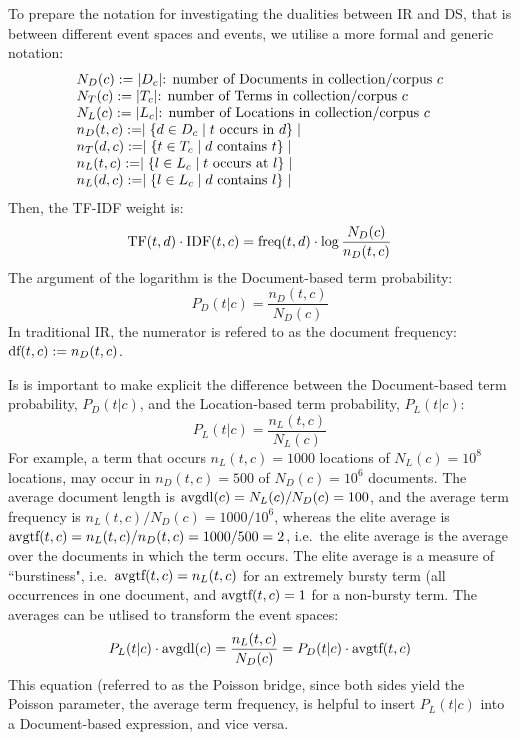 To prepare the notation for investigating the dualities between IR and DS,
that is between different event spaces and events,
we utilise a more formal and generic notation:
\[
\begin{array}{ll}
N_D(c) := |D_c| \textmd{: number of Documents in collection/corpus $c$}\\
N_T(c) := |T_c| \textmd{: number of Terms in collection/corpus $c$}\\
N_L(c) := |L_c| \textmd{: number of Locations in collection/corpus $c$}\\
n_D(t,c) := \mid \{d \in D_c \mid t \ \textmd{occurs in} \ d\}\mid\\
n_T(d,c) := \mid \{t \in T_c \mid d \ \textmd{contains} \ t\} \mid\\
n_L(t,c) := \mid \{l \in L_c \mid t \ \textmd{occurs at} \ l\} \mid\\
n_L(d,c) := \mid \{l \in L_c \mid d \ \textmd{contains} \ l\} \mid\\
\end{array}
\]
Then, the TF-IDF weight is:
\begin{equation}
\label{tf-idf}
\textmd{TF}(t,d) \cdot \textmd{IDF}(t,c) =
	\textmd{freq}(t, d) \cdot
	\log{{N_D(c)} \over n_D(t,c)}
\end{equation}
The argument of the logarithm is the Document-based term probability:
\[
P_{D}(t|c) =\frac{n_D(t,c)}{N_D(c)}
\]
In traditional IR, the numerator is refered to as the document frequency:
$\textmd{df}(t,c):=n_D(t,c)$.

Is is important to make explicit the difference between the Document-based
term probability, $P_D(t|c)$, and the Location-based term probability, $P_L(t|c)$:
\[
P_{L}(t|c) =\frac{n_L(t,c)}{N_L(c)}
\]
For example, a term that occurs $n_L(t,c)=1000$ locations of $N_L(c)=10^8$ locations,
may occur in $n_D(t,c)=500$ of $N_D(c)=10^6$ documents.
%
The average document length is $\textmd{avgdl}(c)=N_L(c)/N_D(c)=100$, and the
average term frequency is $n_L(t,c)/N_D(c)=1000/10^6$, whereas the
elite average is $\textmd{avgtf}(t,c)=n_L(t,c)/n_D(t,c)=1000/500=2$,
i.e.~the elite average is the average
over the documents in which the term occurs.
%
The elite average is a measure of ``burstiness", i.e.~$\textmd{avgtf}(t,c)=n_L(t,c)$ for
an extremely bursty term (all occurrences in one document, and $\textmd{avgtf}(t,c)=1$
for a non-bursty term.
%
The averages can be utlised to transform the event spaces:
\[
P_L(t|c) \cdot \textmd{avgdl}(c) = \frac{n_L(t,c)}{N_D(c)} = P_D(t|c) \cdot \textmd{avgtf}(t,c)
\]
This equation (referred to as the Poisson bridge, since both sides yield
the Poisson parameter, the average term frequency, is helpful to insert
$P_L(t|c)$ into a Document-based expression, and vice versa.


